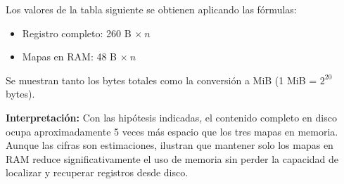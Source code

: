 Los valores de la tabla siguiente se obtienen aplicando las fórmulas:

\begin{itemize}
    \item Registro completo: 260 B $\times~n$
    \item Mapas en RAM: 48 B $\times~n$
\end{itemize}

Se muestran tanto los bytes totales como la conversión a MiB (1 MiB = $2^{20}$ bytes).



\noindent\textbf{Interpretación:} Con las hipótesis indicadas, el contenido completo en disco ocupa aproximadamente 5 veces más espacio que los tres mapas en memoria. 
Aunque las cifras son estimaciones, ilustran que mantener solo los mapas en RAM reduce significativamente el uso de memoria sin perder la capacidad de localizar y recuperar registros desde disco.